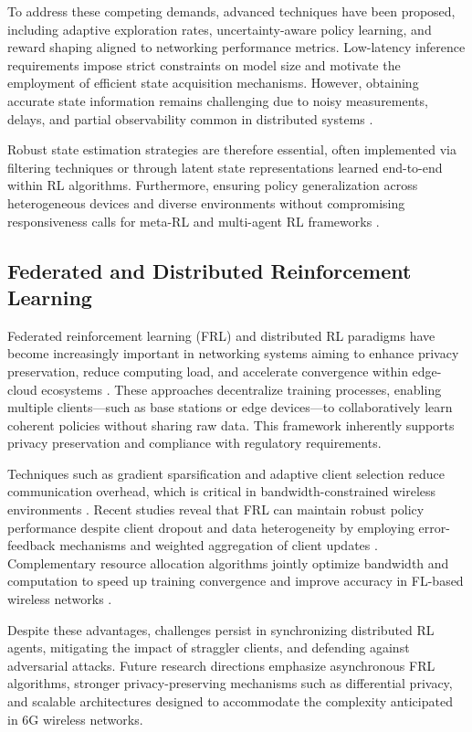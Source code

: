\documentclass[sigconf]{acmart}
\begin{document}
To address these competing demands, advanced techniques have been proposed, including adaptive exploration rates, uncertainty-aware policy learning, and reward shaping aligned to networking performance metrics. Low-latency inference requirements impose strict constraints on model size and motivate the employment of efficient state acquisition mechanisms. However, obtaining accurate state information remains challenging due to noisy measurements, delays, and partial observability common in distributed systems \cite{ref3}.

Robust state estimation strategies are therefore essential, often implemented via filtering techniques or through latent state representations learned end-to-end within RL algorithms. Furthermore, ensuring policy generalization across heterogeneous devices and diverse environments without compromising responsiveness calls for meta-RL and multi-agent RL frameworks \cite{ref14}.

\subsection{Federated and Distributed Reinforcement Learning}

Federated reinforcement learning (FRL) and distributed RL paradigms have become increasingly important in networking systems aiming to enhance privacy preservation, reduce computing load, and accelerate convergence within edge-cloud ecosystems \cite{ref49,ref50}. These approaches decentralize training processes, enabling multiple clients—such as base stations or edge devices—to collaboratively learn coherent policies without sharing raw data. This framework inherently supports privacy preservation and compliance with regulatory requirements.

Techniques such as gradient sparsification and adaptive client selection reduce communication overhead, which is critical in bandwidth-constrained wireless environments \cite{ref49}. Recent studies reveal that FRL can maintain robust policy performance despite client dropout and data heterogeneity by employing error-feedback mechanisms and weighted aggregation of client updates \cite{ref49}. Complementary resource allocation algorithms jointly optimize bandwidth and computation to speed up training convergence and improve accuracy in FL-based wireless networks \cite{ref50}.

Despite these advantages, challenges persist in synchronizing distributed RL agents, mitigating the impact of straggler clients, and defending against adversarial attacks. Future research directions emphasize asynchronous FRL algorithms, stronger privacy-preserving mechanisms such as differential privacy, and scalable architectures designed to accommodate the complexity anticipated in 6G wireless networks.
\end{document}
